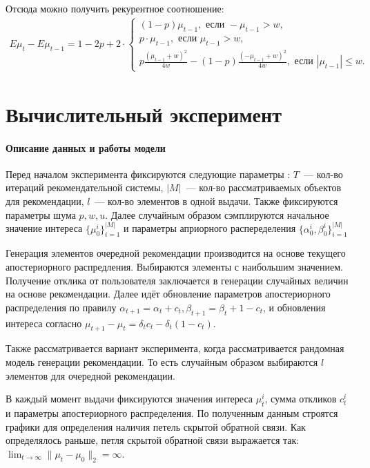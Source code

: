 \documentclass[12pt, twoside]{article}
\begin{document}
Отсюда можно получить рекурентное соотношение:
\begin{gather*}
  E \mu_{t} - E \mu_{t-1} = 1 - 2p + 2 \cdot 
    \begin{cases} 
      (1-p) \mu_{t-1}, \text{ если } -\mu_{t-1} > w, \\
      p \cdot \mu_{t-1}, \text{ если } \mu_{t-1} > w, \\
      p\frac{(\mu_{t-1} + w)^2}{4 w} - (1-p)\frac{(-\mu_{t-1} + w)^2}{4 w}, \text{ если } |\mu_{t-1}| \leq w.
    \end{cases} 
\end{gather*}

\section{Вычислительный эксперимент}
\paragraph{Описание данных и работы модели}
Перед началом эксперимента фиксируются следующие параметры : $T$~--- кол-во итераций рекомендательной системы, $|M|$~--- кол-во рассматриваемых объектов для рекомендации, $l$~--- кол-во элементов в одной выдачи. 
Также фиксируются параметры шума $p, w, u$.
Далее случайным образом сэмплируются начальное значение интереса $\{\mu_0^i\}_{i=1}^{|M|}$ и параметры априорного распеределения $\{\alpha_0^i, \beta_0^i\}_{i=1}^{|M|}$  

Генерация элементов очередной рекомендации производится на основе текущего апостериорного распредления. 
Выбираются элементы с наибольшим значением. 
Получение отклика от пользователя заключается в генерации случайных величин на основе рекомендации.
Далее идёт обновление параметров апостериорного распределения по правилу $\alpha_{t+1} = \alpha_t + c_t, \beta_{t+1} = \beta_t + 1 - c_t$, и обновления интереса согласно 
$\mu_{t+1} - \mu_{t} = \delta_t c_t - \delta_t (1 - c_t)$.

Также рассматривается вариант эксперимента, когда рассматривается рандомная модель генерации рекомендации. То есть случайным образом выбираются $l$ элементов для очередной рекомендации. 

В каждый момент выдачи фиксируются значения интереса $\mu_t^i$, сумма откликов $c_t^i$ и параметры апостериорного распределения. 
По полученным данным строятся графики для определения наличия петель скрытой обратной связи.
Как определялось раньше, петля скрытой обратной связи выражается так: $\lim_{t \to \infty} \|\mu_t - \mu_0 \|_2 = \infty$.
\end{document}
